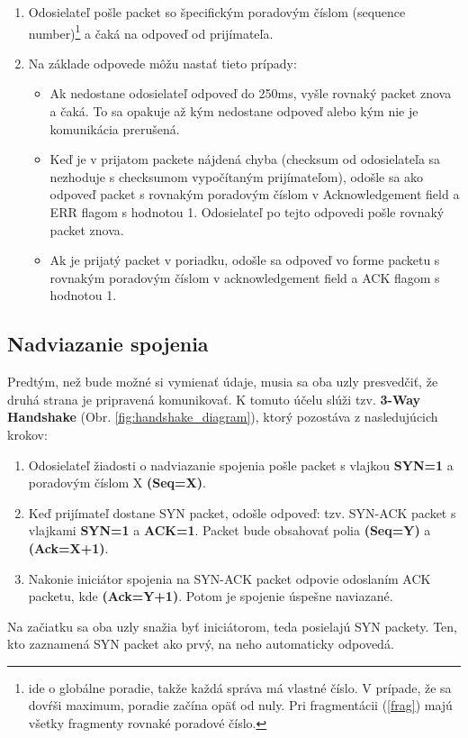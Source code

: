 \documentclass[a4paper,12pt]{article}
\begin{document}
    \begin{enumerate}
        \item Odosielateľ pošle packet so špecifickým poradovým číslom (sequence number)\footnote{ide o globálne poradie, takže každá správa má vlastné číslo. V prípade, že sa dovŕši maximum, poradie začína opäť od nuly. Pri fragmentácii (\ref{frag}) majú všetky fragmenty rovnaké poradové číslo.} a čaká na odpoveď od prijímateľa. 
	\item Na základe odpovede môžu nastať tieto prípady:	
	\begin{itemize}        
		\item Ak nedostane odosielateľ odpoveď do 250ms, vyšle rovnaký packet znova a čaká. To sa opakuje až kým nedostane odpoveď alebo kým nie je komunikácia prerušená.
		\item Keď je v prijatom packete nájdená chyba (checksum od odosielateľa sa nezhoduje s checksumom vypočítaným prijímateľom), odošle sa ako odpoveď packet s rovnakým poradovým číslom v Acknowledgement field a ERR flagom s hodnotou 1. Odosielateľ po tejto odpovedi pošle rovnaký packet znova.
	        \item Ak je prijatý packet v poriadku, odošle sa odpoveď vo forme packetu s rovnakým poradovým číslom v acknowledgement field a ACK flagom s hodnotou 1.
   	\end{itemize}
    \end{enumerate}

    \subsection{Nadviazanie spojenia}
	Predtým, než bude možné si vymienať údaje, musia sa oba uzly presvedčiť, že druhá strana je pripravená komunikovať. K tomuto účelu slúži tzv. \textbf{3-Way Handshake} (Obr. \ref{fig:handshake_diagram}), ktorý pozostáva z nasledujúcich krokov:
	
	\begin{enumerate}
	    \item 
		Odosielateľ žiadosti o nadviazanie spojenia pošle packet s vlajkou \textbf{SYN=1} a poradovým číslom X \textbf{(Seq=X)}.
	    \item 
		Keď prijímateľ dostane SYN packet, odošle odpoveď: tzv. SYN-ACK packet s vlajkami \textbf{SYN=1} a \textbf{ACK=1}. Packet bude obsahovať polia \textbf{(Seq=Y)} a \textbf{(Ack=X+1)}.
	    \item 
		Nakonie iniciátor spojenia na SYN-ACK packet odpovie odoslaním ACK packetu, kde \textbf{(Ack=Y+1)}. Potom je spojenie úspešne naviazané.
	\end{enumerate}
	Na začiatku sa oba uzly snažia byť iniciátorom, teda posielajú SYN packety. Ten, kto zaznamená SYN packet ako prvý, na neho automaticky odpovedá.	
\end{document}

